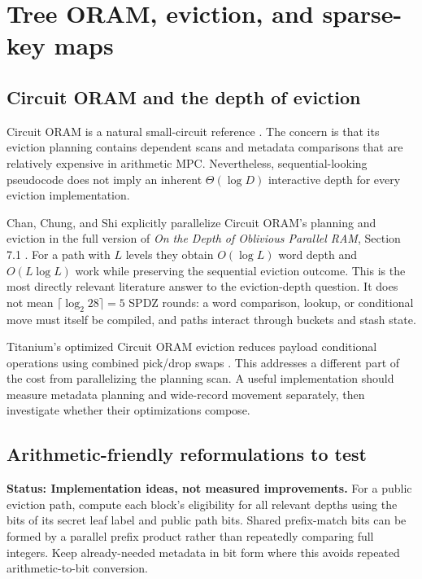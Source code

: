 \documentclass[11pt]{article}
\newcommand{\status}[1]{\textbf{Status: #1.}}
\begin{document}
\section{Tree ORAM, eviction, and sparse-key maps}\label{sec:trees}

\subsection{Circuit ORAM and the depth of eviction}

Circuit ORAM is a natural small-circuit reference \cite{circuit2015}. The
concern is that its eviction planning contains dependent scans and metadata
comparisons that are relatively expensive in arithmetic MPC. Nevertheless,
sequential-looking pseudocode does not imply an inherent $\Theta(\log D)$
interactive depth for every eviction implementation.

Chan, Chung, and Shi explicitly parallelize Circuit ORAM's planning and eviction
in the full version of \emph{On the Depth of Oblivious Parallel RAM}, Section 7.1
\cite{ccs2017}. For a path with $L$ levels they obtain $O(\log L)$ word depth and
$O(L\log L)$ work while preserving the sequential eviction outcome. This is the
most directly relevant literature answer to the eviction-depth question.
It does not mean $\lceil\log_2 28\rceil=5$ SPDZ rounds: a word comparison, lookup,
or conditional move must itself be compiled, and paths interact through buckets
and stash state.

Titanium's optimized Circuit ORAM eviction reduces payload conditional
operations using combined pick/drop swaps \cite{titanium2022}. This addresses a
different part of the cost from parallelizing the planning scan. A useful
implementation should measure metadata planning and wide-record movement
separately, then investigate whether their optimizations compose.

\subsection{Arithmetic-friendly reformulations to test}

\status{Implementation ideas, not measured improvements}
For a public eviction path, compute each block's eligibility for all relevant
depths using the bits of its secret leaf label and public path bits. Shared
prefix-match bits can be formed by a parallel prefix product rather than
repeatedly comparing full integers. Keep already-needed metadata in bit form
where this avoids repeated arithmetic-to-bit conversion.
\end{document}
